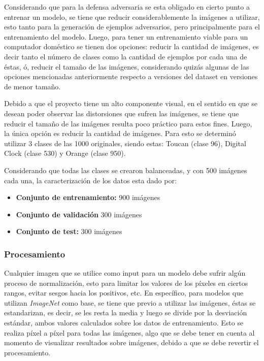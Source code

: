 \documentclass[conference]{IEEEtran}
\begin{document}
Considerando que para la defensa adversaria se esta obligado en cierto punto a entrenar un modelo, se tiene que reducir considerablemente la imágenes a utilizar, esto tanto para la generación de ejemplos adversarios, pero principalmente para el entrenamiento del modelo. Luego, para tener un entrenamiento viable para un computador doméstico se tienen dos opciones: reducir la cantidad de imágenes, es decir tanto el número de clases como la cantidad de ejemplos por cada una de éstas, ó, reducir el tamaño de las imágenes, considerando quizás algunas de las opciones mencionadas anteriormente respecto a versiones del dataset en versiones de menor tamaño.

Debido a que el proyecto tiene un alto componente visual, en el sentido en que se desean poder observar las distorsiones que sufren las imágenes, se tiene que reducir el tamaño de las imágenes resulta poco práctico para estos fines. Luego, la única opción es reducir la cantidad de imágenes. Para esto se determinó utilizar 3 clases de las 1000 originales, siendo estas: Toucan (clase 96), Digital Clock (clase 530) y Orange (clase 950).

Considerando que todas las clases se crearon balanceadas, y con 500 imágenes cada una, la caracterización de los datos esta dado por:

\begin{itemize}
    \item \textbf{Conjunto de entrenamiento:}  900 imágenes
    \item \textbf{Conjunto de validación} 300 imágenes
    \item \textbf{Conjunto de test:} 300 imágenes
\end{itemize}

\subsubsection{Procesamiento}

Cualquier imagen que se utilice como input para un modelo debe sufrir algún proceso de normalización, esto para limitar los valores de los píxeles en ciertos rangos, evitar sesgos hacia los positivos, etc. En específico, para modelos que utilizan \textit{ImageNet} como base, se tiene que previo a utilizar las imágenes, éstas se estandarizan, es decir, se les resta la media y luego se divide por la desviación estándar, ambos valores calculados sobre los datos de entrenamiento. Esto se realiza píxel a píxel para todas las imágenes, algo que se debe tener en cuenta al momento de visualizar resultados sobre imágenes, debido a que se debe revertir el procesamiento. 
\end{document}
